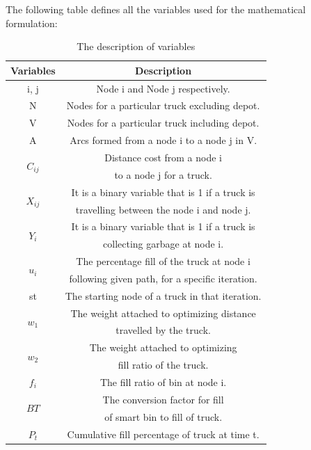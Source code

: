 \documentclass[12pt]{article}
\begin{document}
The following table defines all the variables used for the mathematical formulation:
\begin{table}[H]\label{variables}
	\centering
	\caption{The description of variables}
	\begin{tabular*}{486pt}[H]{|c|c|}
		\hline \hspace{85pt} Variables \hspace{85pt} & \hspace{85pt } Description \hspace{85pt} \\
		\hline i, j & Node i and Node j respectively.\\
		\hline N & Nodes for a particular truck excluding depot.\\
		\hline V & Nodes for a particular truck including depot.\\
		\hline A & Arcs formed from a node i to a node j in V.\\
		\hline \multirow{2}{*}{$C_{ij}$} & Distance cost from a node i\\
		& to a node j for a truck.\\
		\hline \multirow{2}{*}{$X_{ij}$} & It is a binary variable that is 1 if a truck is\\
		& travelling between the node i and node j.\\  
		\hline \multirow{2}{*}{$Y_{i}$} & It is a binary variable that is 1 if a truck is \\
		& collecting garbage at node i.\\
		\hline \multirow{2}{*}{$u_{i}$} & The percentage fill of the truck at node i \\
		& following given path, for a specific iteration.\\
		\hline \multirow{1}{*}{st} & The starting node of a truck in that iteration.\\
		\hline \multirow{2}{*}{$w_{1}$} & The weight attached to optimizing distance\\
		& travelled by the truck.\\
		\hline \multirow{2}{*}{$w_{2}$} & The weight attached to optimizing \\
		& fill ratio of the truck.\\
		\hline \multirow{1}{*}{$f_{i}$} & The fill ratio of bin at node i.\\
		\hline \multirow{2}{*}{$BT$} & The conversion factor for fill \\
		& of smart bin to fill of truck.\\
		\hline \multirow{1}{*}{$P_{t}$} & Cumulative fill percentage of truck at time t.\\
		\hline
	\end{tabular*}
\end{table} 
\end{document}
